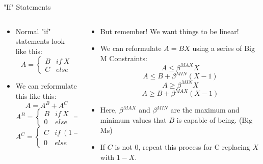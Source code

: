\documentclass[10pt, aspectratio=169]{beamer}
\begin{document}
\begin{frame}{"If" Statements}
    \begin{columns}[t]
        \begin{column}[t]{0.5\textwidth}
            \begin{itemize}
                \item Normal "if" statements look like this:
                $$A = \begin{cases}B & if\ X\\C & else \end{cases}$$
                \item We can reformulate this like this:
                $$A = A^B + A^C$$
                $$A^B = \begin{cases}B & if\ X\\0 & else \end{cases} = BX$$
                $$A^C = \begin{cases}C & if\ (1-X)\\0 & else \end{cases} = C(1-X)$$
            \end{itemize}
        \end{column}
        \begin{column}[t]{0.5\textwidth}
            \begin{itemize}
                \item But remember! We want things to be linear!
                \item We can reformulate $A = BX$ using a series of Big M Constraints:
                $$A \leq \beta^{MAX} X$$
                $$A \leq B + \beta^{MIN}(X-1)$$
                $$A \geq \beta^{MIN}X$$
                $$A \geq B + \beta^{MAX}(X-1)$$
                \item Here, $\beta^{MAX}$ and $\beta^{MIN}$ are the maximum and minimum values that $B$ is capable of being. (Big Ms)
                \item If $C$ is not 0, repeat this process for C replacing $X$ with $1-X$.
            \end{itemize}
        \end{column}
    \end{columns}
\end{frame}
\end{document}
